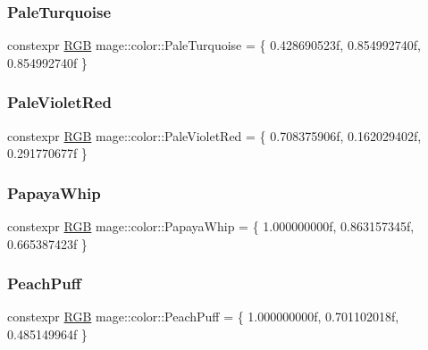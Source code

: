 \mbox{\label{namespacemage_1_1color_ad6ef41327e0e1d862f7b95324e93b4a1}} 
\subsubsection{\texorpdfstring{Pale\+Turquoise}{PaleTurquoise}}
{\footnotesize\ttfamily constexpr \mbox{\hyperlink{structmage_1_1_r_g_b}{R\+GB}} mage\+::color\+::\+Pale\+Turquoise = \{ 0.\+428690523f, 0.\+854992740f, 0.\+854992740f \}}

\mbox{\label{namespacemage_1_1color_a86d236f89e45680e1678c6d1e9a287bc}} 
\subsubsection{\texorpdfstring{Pale\+Violet\+Red}{PaleVioletRed}}
{\footnotesize\ttfamily constexpr \mbox{\hyperlink{structmage_1_1_r_g_b}{R\+GB}} mage\+::color\+::\+Pale\+Violet\+Red = \{ 0.\+708375906f, 0.\+162029402f, 0.\+291770677f \}}

\mbox{\label{namespacemage_1_1color_a209f72744c785cbc48f954bd42b35f79}} 
\subsubsection{\texorpdfstring{Papaya\+Whip}{PapayaWhip}}
{\footnotesize\ttfamily constexpr \mbox{\hyperlink{structmage_1_1_r_g_b}{R\+GB}} mage\+::color\+::\+Papaya\+Whip = \{ 1.\+000000000f, 0.\+863157345f, 0.\+665387423f \}}

\mbox{\label{namespacemage_1_1color_a6ec38a42d469de89ab50cd4db3338754}} 
\subsubsection{\texorpdfstring{Peach\+Puff}{PeachPuff}}
{\footnotesize\ttfamily constexpr \mbox{\hyperlink{structmage_1_1_r_g_b}{R\+GB}} mage\+::color\+::\+Peach\+Puff = \{ 1.\+000000000f, 0.\+701102018f, 0.\+485149964f \}}

